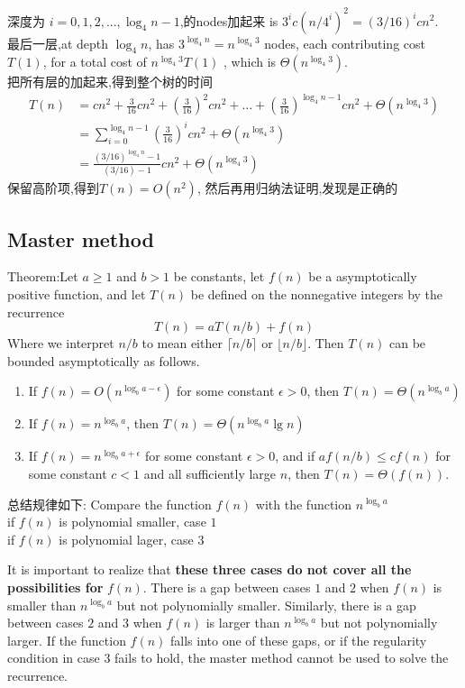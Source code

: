 \documentclass{article}
\begin{document}
深度为 $i = 0, 1, 2,..., \log_4 n - 1$,的nodes加起来 is $3^i c(n/4^i)^2 = (3/16)^icn^2$.\\
最后一层,at depth $\log_4n$, has $3^{\log_4 n} = n^{\log_4 3}$ nodes, each contributing cost $T(1)$, for a total cost of $n^{\log_4 3}T(1)$ , which is $\Theta(n^{\log_4 3})$.\\
把所有层的加起来,得到整个树的时间
\begin{equation}
\begin{split}
		T(n) & = cn^2 + \frac{3}{16} cn^2 + (\frac{3}{16})^2 cn^2 + \dots + (\frac{3}{16})^{\log_4 n - 1}cn^2 + \Theta(n^{\log_4 3}) \\
				   & = \sum_{i=0}^{\log_4 n - 1}(\frac{3}{16})^i cn^2 + \Theta(n^{\log_4 3}) \\
				   & = \frac{(3/16)^{\log_4 n} - 1}{(3/16)-1} cn^2 + \Theta(n^{\log_4 3})
\end{split}
\end{equation}
保留高阶项,得到$T(n)=O(n^2)$,
然后再用归纳法证明,发现是正确的

\subsection{Master method}
Theorem:Let $a \geq 1$ and $b > 1$ be constants, let $f(n)$ be a asymptotically positive function, and let $T(n)$ be defined on the nonnegative integers by the recurrence
$$T(n) = aT(n/b) + f(n)$$
Where we interpret $n/b$ to mean either $\lceil n/b \rceil$ or $\lfloor n/b \rfloor$. Then $T(n)$ can be bounded asymptotically as follows.
\begin{enumerate}
	\item If $f(n) = O(n^{\log_b a - \epsilon})$ for some constant $\epsilon > 0$, then $T(n) = \Theta(n^{\log_b a})$
	\item If $f(n) = n^{\log_{b} a}$, then $T(n) = \Theta(n^{\log_b a} \lg n)$
	\item If $f(n) = n^{\log_{b} a + \epsilon}$ for some constant $\epsilon > 0$, and if $a f(n/b) \leq cf(n)$ for some constant $c < 1$ and all sufficiently large $n$, then $T(n) = \Theta(f(n))$.
\end{enumerate}

总结规律如下:
Compare the function $f(n)$ with the function  $n^{\log_b a}$\\
if $f(n)$ is polynomial smaller, case $1$\\
if $f(n)$ is polynomial lager, case $3$

It is important to realize that \textbf{these three cases do not cover all the possibilities for} $f(n)$.
There is a gap between cases $1$ and $2$ when $f(n)$ is smaller than $n^{\log_b a}$ but not polynomially smaller.
Similarly, there is a gap between cases $2$ and $3$ when $f(n)$ is larger than $n^{\log_b a}$ but not polynomially larger.
If the function $f(n)$ falls into one of these gaps, or if the regularity condition in case $3$ fails to hold,
the master method cannot be used to solve the recurrence.
\end{document}
